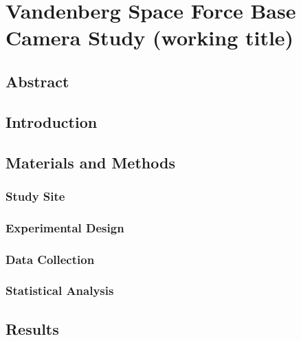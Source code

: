 \chapter{Vandenberg Space Force Base Camera Study (working title)}

\section{Abstract}

\section{Introduction}
\lipsum[1]  %

\section{Materials and Methods}
\subsection{Study Site}

\subsection{Experimental Design}

\subsection{Data Collection}

\subsection{Statistical Analysis}

\section{Results}
\lipsum[2]  %

